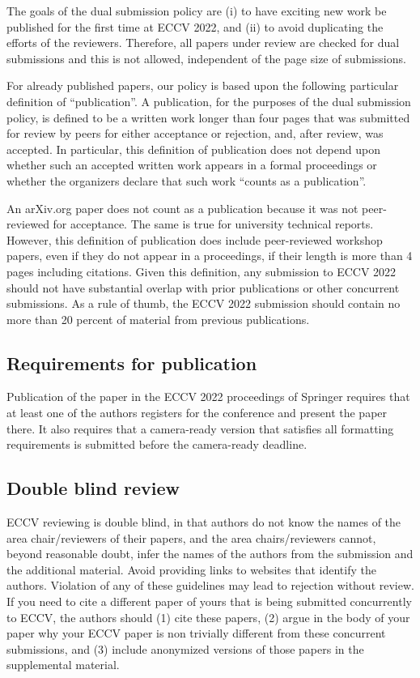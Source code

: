 \documentclass[runningheads]{llncs}
\begin{document}
The goals of the dual submission policy are (i) to have exciting new work be published for the first time at ECCV 2022, and (ii) to avoid duplicating the efforts of the reviewers.
Therefore, all papers under review are checked for dual submissions and this is not allowed, independent of the page size of submissions. 

For already published papers, our policy is based upon the following particular definition of ``publication''. A publication, for the purposes of the dual submission policy, is defined to be a written work longer than four pages that was submitted for review by peers for either acceptance or rejection, and, after review, was accepted. In particular, this definition of publication does not depend upon whether such an accepted written work appears in a formal proceedings or whether the organizers declare that such work ``counts as a publication''. 

An arXiv.org paper does not count as a publication because it was not peer-reviewed for acceptance. The same is true for university technical reports. However, this definition of publication does include peer-reviewed workshop papers, even if they do not appear in a proceedings, if their length is more than 4 pages including citations. Given this definition, any submission to ECCV 2022 should not have substantial overlap with prior publications or other concurrent submissions. As a rule of thumb, the ECCV 2022 submission should contain no more than 20 percent of material from previous publications. 

\subsection{Requirements for publication}
Publication of the paper in the ECCV 2022 proceedings of Springer requires that at least one of the authors registers for the conference and present the paper there. It also requires that a camera-ready version that satisfies all formatting requirements is submitted before the camera-ready deadline. 
\subsection{Double blind review}
\label{sec:blind}
ECCV reviewing is double blind, in that authors do not know the names of the area chair/reviewers of their papers, and the area chairs/reviewers cannot, beyond reasonable doubt, infer the names of the authors from the submission and the additional material. Avoid providing links to websites that identify the authors. Violation of any of these guidelines may lead to rejection without review. If you need to cite a different paper of yours that is being submitted concurrently to ECCV, the authors should (1) cite these papers, (2) argue in the body of your paper why your ECCV paper is non trivially different from these concurrent submissions, and (3) include anonymized versions of those papers in the supplemental material.
\end{document}
